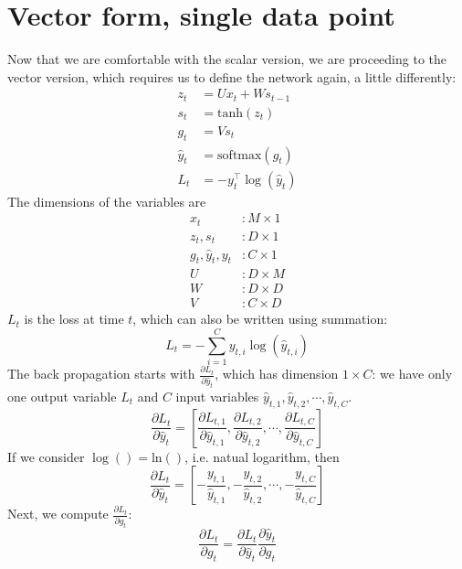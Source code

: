 \documentclass{article}
\begin{document}
\section{Vector form, single data point}
Now that we are comfortable with the scalar version, we are proceeding to the vector version, which requires us to define the network again, a little differently:
\begin{align}
    z_t &= Ux_t + Ws_{t-1} \\
    s_t &= \text{tanh}(z_t) \\
    g_t &= Vs_t \\
    \hat{y}_t &= \text{softmax}(g_t) \\
    L_t &= -y^\top_t\log(\hat{y}_t)
\end{align}
The dimensions of the variables are
\begin{align}
    x_t&: M\times 1\\ 
    z_t, s_t&: D\times 1\\
    g_t, \hat{y}_t, y_t&: C\times 1\\
    U&: D\times M\\
    W&:  D\times D\\
    V&: C\times D
\end{align}
 $L_t$ is the loss at time $t$, which can also be written using summation:
\begin{equation}
    L_t = -\sum_{i=1}^{C}y_{t, i}\log(\hat{y}_{t, i})
\end{equation}
The back propagation starts with  $\frac{\partial L_t}{\partial \hat{y}_t}$, which has dimension $1\times C$: we have only one output variable $L_t$ and $C$ input variables $\hat{y}_{t, 1}, \hat{y}_{t, 2}, \cdots, \hat{y}_{t, C}$.
\begin{equation}
    \frac{\partial L_t}{\partial \hat{y}_t} = [\frac{\partial L_{t, 1}}{\partial \hat{y}_{t, 1}}, \frac{\partial L_{t, 2}}{\partial \hat{y}_{t, 2}}, \cdots, \frac{\partial L_{t, C}}{\partial \hat{y}_{t, C}}]
\end{equation}
If we consider $\log() = \text{ln}()$, i.e. natual logarithm, then 
\begin{equation}
    \frac{\partial L_t}{\partial \hat{y}_t} = [-\frac{y_{t, 1}}{\hat{y}_{t, 1}}, -\frac{y_{t, 2}}{\hat{y}_{t, 2}}, \cdots, -\frac{y_{t, C}}{\hat{y}_{t, C}}]
\end{equation}
Next, we compute $\frac{\partial L_t}{\partial g_t}$:
\begin{equation}
    \frac{\partial L_t}{\partial g_t} = \frac{\partial L_t}{\partial \hat{y}_t}\frac{\partial \hat{y}_t}{\partial g_t}
\end{equation}
\end{document}
